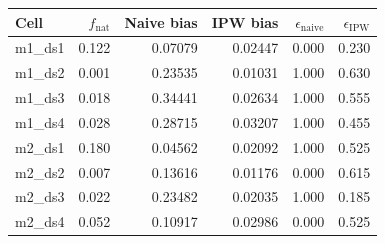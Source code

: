 \documentclass[a4paper,fleqn]{cas-sc}
\theoremstyle{plain}
\theoremstyle{definition}
\theoremstyle{remark}
\begin{document}
\begin{center}
\begin{minipage}{0.92\textwidth}
\centering

\captionsetup{
  font=small,
  skip=5pt,
  justification=justified,
  singlelinecheck=false
}

\small
\setlength{\tabcolsep}{5.2pt}
\renewcommand{\arraystretch}{0.98}

\begin{tabular}{@{}lrrrrr@{}}
\toprule
Cell &
$f_{\mathrm{nat}}$ &
Naive bias &
IPW bias &
$\epsilon_{\mathrm{naive}}$ &
$\epsilon_{\mathrm{IPW}}$ \\
\midrule
m1\_ds1 & 0.122 & 0.07079 & 0.02447 & 0.000 & 0.230 \\
m1\_ds2 & 0.001 & 0.23535 & 0.01031 & 1.000 & 0.630 \\
m1\_ds3 & 0.018 & 0.34441 & 0.02634 & 1.000 & 0.555 \\
m1\_ds4 & 0.028 & 0.28715 & 0.03207 & 1.000 & 0.455 \\
m2\_ds1 & 0.180 & 0.04562 & 0.02092 & 1.000 & 0.525 \\
m2\_ds2 & 0.007 & 0.13616 & 0.01176 & 0.000 & 0.615 \\
m2\_ds3 & 0.022 & 0.23482 & 0.02035 & 1.000 & 0.185 \\
m2\_ds4 & 0.052 & 0.10917 & 0.02986 & 0.000 & 0.525 \\
\bottomrule
\end{tabular}

\label{tab:a01_ipw_naive}

\end{minipage}
\end{center}

\vspace{0.55\baselineskip}



\Needspace{0.34\textheight}
\par\medskip
\end{document}
